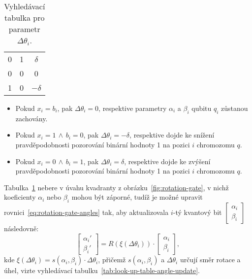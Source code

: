 \begin{enumerate}
\begin{table}[ht!]
\begin{tabular}{|c c|c|}
            0     & 1     & $\delta$              \\ 
            0     & 0     & 0                \\ 
            1     & 0     & $-\delta$             \\
            \hline
            \end{tabular}
            \caption{Vyhledávací tabulka pro parametr $\Delta\theta_i$.}
            \label{tab:look-up-table-Delta}
        \end{table}
        \begin{itemize}
            \item Pokud $x_i = b_i$, pak $\Delta\theta_i = 0$, respektive parametry $\alpha_i$ a $\beta_i$ qubitu $q_i$ zůstanou zachovány.
            \item Pokud $x_i = 1\,\wedge\,b_i = 0$, pak $\Delta\theta_i = -\delta$, respektive dojde ke snížení pravděpodobnosti pozorování binární hodnoty 1 na pozici $i$ chromozomu $q$. 
            \item Pokud $x_i = 0\,\wedge\,b_i = 1$, pak $\Delta\theta_i =  \delta$, respektive dojde ke zvýšení pravděpodobnosti pozorování binární hodnoty 1 na pozici $i$ chromozomu $q$. 
        \end{itemize}
        Tabulka~\ref{tab:look-up-table-Delta} nebere v úvahu kvadranty z obrázku~\ref{fig:rotation-gate}, v nichž koeficienty $\alpha_i$ nebo $\beta_i$ mohou být záporné, tudíž je možné upravit rovnici~\ref{eq:rotation-gate-angles} tak, aby aktualizovala $i$-tý kvantový bit $\begin{bmatrix} \alpha_i \\ \beta_i \end{bmatrix}$ následovně:
        \begin{equation}\label{eq:rotation-gate-angles-update}
            \begin{bmatrix}
                \alpha_i' \\
                \beta_i' 
            \end{bmatrix}
            =
            R\left(\xi \left( \Delta\theta_i \right)\right) \cdot
            \begin{bmatrix}
                \alpha_i \\
                \beta_i 
            \end{bmatrix},
        \end{equation}
        kde $\xi \left( \Delta\theta_i \right) = s\left( \alpha_i , \beta_i \right) \cdot \Delta\theta_i $, přičemž $s\left( \alpha_i , \beta_i \right)$ a $\Delta\theta_i$ určují směr rotace a úhel, vizte vyhledávací tabulku~\ref{tab:look-up-table-angle-update}.

\end{enumerate}
